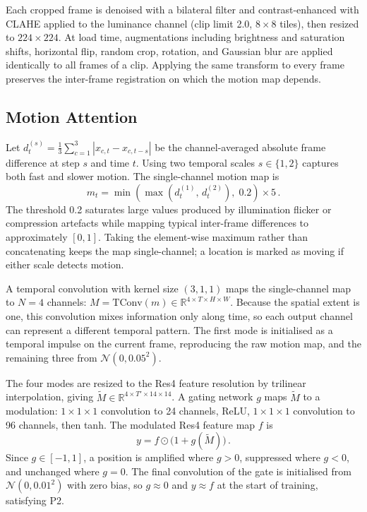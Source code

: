 \documentclass[conference]{IEEEtran}
\begin{document}
Each cropped frame is denoised with a bilateral filter and
contrast-enhanced with CLAHE applied to the luminance channel (clip
limit 2.0, $8 \times 8$ tiles), then resized to $224 \times 224$. At
load time, augmentations including brightness and saturation shifts,
horizontal flip, random crop, rotation, and Gaussian blur are applied
identically to all frames of a clip. Applying the same transform to
every frame preserves the inter-frame registration on which the motion
map depends.

\subsection{Motion Attention}
\label{sec:ma}

Let $d^{(s)}_t = \frac{1}{3} \sum_{c=1}^{3} |x_{c,t} - x_{c,t-s}|$
be the channel-averaged absolute frame difference at step $s$ and time
$t$. Using two temporal scales $s \in \{1, 2\}$ captures both fast and
slower motion. The single-channel motion map is
\begin{equation}
  m_t = \min\!\left( \max\!\left(d^{(1)}_t,\, d^{(2)}_t\right),\; 0.2 \right) \times 5 \,.
  \label{eq:motion}
\end{equation}
The threshold 0.2 saturates large values produced by illumination
flicker or compression artefacts while mapping typical inter-frame
differences to approximately $[0, 1]$. Taking the element-wise maximum
rather than concatenating keeps the map single-channel; a location is
marked as moving if either scale detects motion.

A temporal convolution with kernel size $(3, 1, 1)$ maps the
single-channel map to $N=4$ channels:
$M = \mathrm{TConv}(m) \in \mathbb{R}^{4 \times T \times H \times W}$.
Because the spatial extent is one, this convolution mixes information
only along time, so each output channel can represent a different
temporal pattern. The first mode is initialised as a temporal impulse
on the current frame, reproducing the raw motion map, and the remaining
three from $\mathcal{N}(0, 0.05^2)$.

The four modes are resized to the Res4 feature resolution by trilinear
interpolation, giving $\tilde{M} \in \mathbb{R}^{4 \times T' \times 14
\times 14}$. A gating network $g$ maps $\tilde{M}$ to a modulation:
$1 \times 1 \times 1$ convolution to 24 channels, ReLU, $1 \times 1
\times 1$ convolution to 96 channels, then tanh. The modulated Res4
feature map $f$ is
\begin{equation}
  y = f \odot \bigl(1 + g(\tilde{M})\bigr) \,.
  \label{eq:gate}
\end{equation}
Since $g \in [-1, 1]$, a position is amplified where $g > 0$,
suppressed where $g < 0$, and unchanged where $g = 0$. The final
convolution of the gate is initialised from $\mathcal{N}(0, 0.01^2)$
with zero bias, so $g \approx 0$ and $y \approx f$ at the start of
training, satisfying P2.
\end{document}
